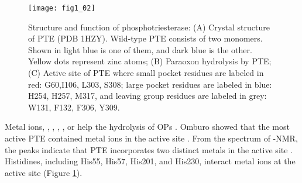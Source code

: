 \begin{refsection}
\begin{figure}[h!] \centering \texttt{[image: fig1\_02]}
    \caption[Structure and function of phosphotriesterase: (A) Crystal
    structure of PTE (PDB 1HZY). Wild-type PTE consists of two monomers. Shown
    in light blue is one of them, and dark blue is the other. Yellow dots
    represent zinc atoms; (B) Paraoxon hydrolysis by PTE; (C) Active site of
    PTE where small pocket residues are labeled in red: G60,I106, L303, S308;
    large pocket residues are labeled in blue: H254, H257, M317, and leaving
    group residues are labeled in grey: W131, F132, F306, Y309.] {Structure and
        function of phosphotriesterase: (A) Crystal structure of PTE (PDB
        1HZY). Wild-type PTE consists of two monomers.  Shown in light blue is
        one of them, and dark blue is the other. Yellow dots represent zinc
        atoms; (B) Paraoxon hydrolysis by PTE;  (C)  Active site of PTE where
        small pocket residues are labeled in red: G60,I106, L303, S308; large
        pocket residues are labeled in blue: H254, H257, M317, and leaving
        group residues are labeled in grey: W131, F132, F306, Y309.}
\label{fig:pte-structure} 
\end{figure} 

Metal ions, , , , , or
 help the hydrolysis of OPs
\cite{Rochu2002b,Carletti2009,Hill2003,Bigley2013,Samples2005,Kim2008}.  Omburo
 showed that the most active PTE contained  metal ions
in the active site \cite{Omburo1992a}. From the spectrum of -NMR,
the peaks indicate that PTE incorporates two distinct metals in the active site
\cite{Omburo1993}.  Histidines, including His55, His57, His201, and His230,
interact metal ions at the active site \cite{Benning2001a} (Figure
\ref{fig:pte-structure}). 


\end{refsection}
